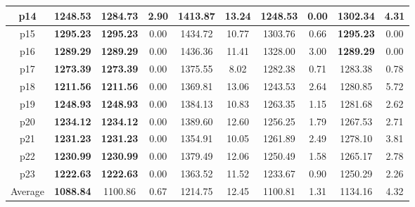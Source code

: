 \begin{table*}[!ht]
{\begin{tabular}{@{}cccccccccc@{}}
			\midrule
			p14 & \textbf{1248.53} & 1284.73 & 2.90 & 1413.87 & 13.24 & \textbf{1248.53} & 0.00 & 1302.34 & 4.31 \\
			\midrule
			p15 & \textbf{1295.23} & \textbf{1295.23} & 0.00 & 1434.72 & 10.77 & 1303.76 & 0.66 & \textbf{1295.23} & 0.00 \\
			\midrule
			p16 & \textbf{1289.29} & \textbf{1289.29} & 0.00 & 1436.36 & 11.41 & 1328.00 & 3.00 & \textbf{1289.29} & 0.00 \\
			\midrule
			p17 & \textbf{1273.39} & \textbf{1273.39} & 0.00 & 1375.55 & 8.02 & 1282.38 & 0.71 & 1283.38 & 0.78 \\
			\midrule
			p18 & \textbf{1211.56} & \textbf{1211.56} & 0.00 & 1369.81 & 13.06 & 1243.53 & 2.64 & 1280.85 & 5.72 \\
			\midrule
			p19 & \textbf{1248.93} & \textbf{1248.93} & 0.00 & 1384.13 & 10.83 & 1263.35 & 1.15 & 1281.68 & 2.62 \\
			\midrule
			p20 & \textbf{1234.12} & \textbf{1234.12} & 0.00 & 1389.60 & 12.60 & 1256.25 & 1.79 & 1267.53 & 2.71 \\
			\midrule
			p21 & \textbf{1231.23} & \textbf{1231.23} & 0.00 & 1354.91 & 10.05 & 1261.89 & 2.49 & 1278.10 & 3.81 \\
			\midrule
			p22 & \textbf{1230.99} & \textbf{1230.99} & 0.00 & 1379.49 & 12.06 & 1250.49 & 1.58 & 1265.17 & 2.78 \\
			\midrule
			p23 & \textbf{1222.63} & \textbf{1222.63} & 0.00 & 1363.52 & 11.52 & 1233.67 & 0.90 & 1250.29 & 2.26 \\
			\midrule
			Average & \textbf{1088.84} & 1100.86 & 0.67 & 1214.75 & 12.45 & 1100.81 & 1.31 & 1134.16 & 4.32 \\
			\bottomrule
		\end{tabular}%
	}

\end{table*}

